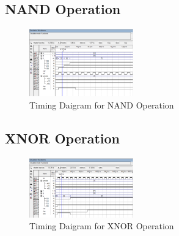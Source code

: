 \subsection{NAND Operation}\label{subsec:nand-operation}

\begin{figure}[H]
    \begin{center}
        \includegraphics[width = 0.4\textwidth]{figures/nand}
    \end{center}
    \caption{Timing Daigram for NAND Operation}
    \label{fig:timing nand}
\end{figure}

\subsection{XNOR Operation}\label{subsec:xnor-operation}
\begin{figure}[H]
    \begin{center}
        \includegraphics[width = 0.4\textwidth]{figures/xnor}
    \end{center}
    \caption{Timing Daigram for XNOR Operation}
    \label{fig:timing xnor}
\end{figure}


